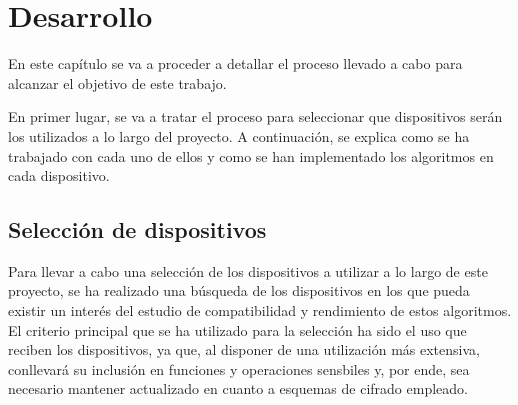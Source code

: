 %
%
%
% 
%
%
%
%

\chapter{Desarrollo}\label{cha:desarrollo}


En este capítulo se va a proceder a detallar el proceso llevado a cabo para alcanzar el objetivo de este trabajo.

En primer lugar, se va a tratar el proceso para seleccionar que dispositivos serán los utilizados a lo largo del proyecto.
A continuación, se explica como se ha trabajado con cada uno de ellos y como se han implementado los algoritmos en cada dispositivo.


\section{Selección de dispositivos}\label{sec:sel-disp}

Para llevar a cabo una selección de los dispositivos a utilizar a lo largo de este proyecto, se ha realizado una búsqueda de los dispositivos en los que pueda existir un interés del estudio de compatibilidad y rendimiento de estos algoritmos.
El criterio principal que se ha utilizado para la selección ha sido el uso que reciben los dispositivos, ya que, al disponer de una utilización más extensiva, conllevará su inclusión en funciones y operaciones sensbiles y, por ende, sea necesario mantener actualizado en cuanto a esquemas de cifrado empleado.

